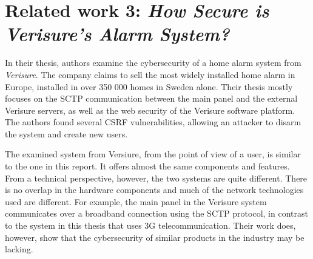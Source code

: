 \section{Related work 3: \textit{How Secure is Verisure’s Alarm System?}}
In their thesis, authors \citeauthor{verisurethesis} examine the cybersecurity of a home alarm system from \textit{Verisure}. The company claims to sell the most widely installed home alarm in Europe, installed in over 350 000 homes in Sweden alone. Their thesis mostly focuses on the SCTP communication between the main panel and the external Verisure servers, as well as the web security of the Verisure software platform. The authors found several \gls{CSRF} vulnerabilities, allowing an attacker to disarm the system and create new users.

The examined system from Versiure, from the point of view of a user, is similar to the one in this report. It offers almost the same components and features. From a technical perspective, however, the two systems are quite different. There is no overlap in the hardware components and much of the network technologies used are different. For example, the main panel in the Verisure system communicates over a broadband connection using the SCTP protocol, in contrast to the system in this thesis that uses 3G telecommunication. Their work does, however, show that the cybersecurity of similar products in the industry may be lacking.
